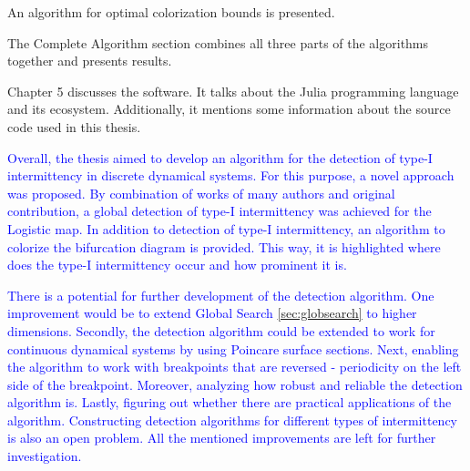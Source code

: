 An algorithm for optimal colorization bounds is presented.
\par
The Complete Algorithm section combines all three parts of the algorithms together and presents results.
\par
Chapter 5 discusses the software.
It talks about the Julia programming language and its ecosystem.
Additionally, it mentions some information about the source code used in this thesis.
\par
\textcolor{blue}{
Overall, the thesis aimed to develop an algorithm for the detection of type-I intermittency in discrete dynamical systems.
For this purpose, a novel approach was proposed.
By combination of works of many authors and original contribution, a global detection of type-I intermittency was achieved for the Logistic map.
In addition to detection of type-I intermittency, an algorithm to colorize the bifurcation diagram is provided.
This way, it is highlighted where does the type-I intermittency occur and how prominent it is.
}
\par
\textcolor{blue}{
There is a potential for further development of the detection algorithm.
One improvement would be to extend Global Search \ref{sec:globsearch} to higher dimensions.
Secondly, the detection algorithm could be extended to work for continuous dynamical systems by using Poincare surface sections.
Next, enabling the algorithm to work with breakpoints that are reversed - periodicity on the left side of the breakpoint.
Moreover, analyzing how robust and reliable the detection algorithm is.
Lastly, figuring out whether there are practical applications of the algorithm.
Constructing detection algorithms for different types of intermittency is also an open problem.
All the mentioned improvements are left for further investigation.
}

\endinput